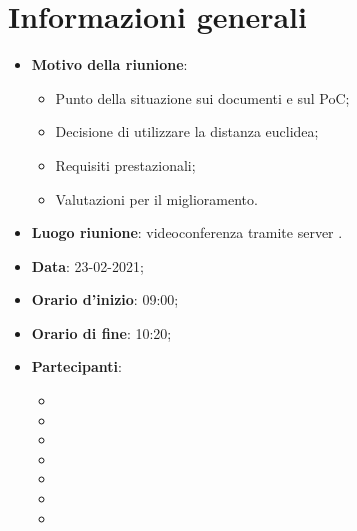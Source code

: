 \section{Informazioni generali}
\begin{itemize}
\item \textbf{Motivo della riunione}: 
\begin{itemize}
\item Punto della situazione sui documenti e sul PoC;
\item Decisione di utilizzare la distanza euclidea;
\item Requisiti prestazionali;
\item Valutazioni per il miglioramento.
\end{itemize}
\item \textbf{Luogo riunione}: videoconferenza tramite server .
\item \textbf{Data}: 23-02-2021;
\item \textbf{Orario d'inizio}: 09:00;
\item \textbf{Orario di fine}: 10:20;
\item \textbf{Partecipanti}:
	\begin{itemize}
	\item \BM{}
	\item \SG{}
	\item \SP{}
	\item \SH{}
	\item \PA{}
	\item \ZM{}
	\item \RA{}
	\end{itemize}
\end{itemize}

\newpage
